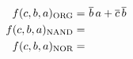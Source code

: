   \begin{align*}
    f(c,b,a)_{\textup{ORG}} =&~ \overline{b}\,a + \overline{c}\,\overline{b}\\
    f(c,b,a)_{\textup{NAND}} =&\\
    f(c,b,a)_{\textup{NOR}} =&\\
   \end{align*}
